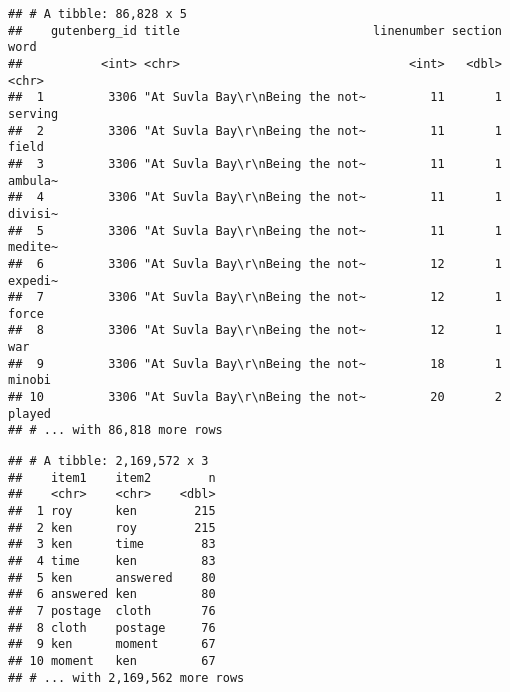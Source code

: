 \documentclass[]{article}
\newenvironment{Shaded}{\begin{snugshade}}{\end{snugshade}}
\newcommand{\DataTypeTok}[1]{\textcolor[rgb]{0.13,0.29,0.53}{#1}}
\newcommand{\DecValTok}[1]{\textcolor[rgb]{0.00,0.00,0.81}{#1}}
\newcommand{\KeywordTok}[1]{\textcolor[rgb]{0.13,0.29,0.53}{\textbf{#1}}}
\newcommand{\NormalTok}[1]{#1}
\newcommand{\OperatorTok}[1]{\textcolor[rgb]{0.81,0.36,0.00}{\textbf{#1}}}
\newcommand{\OtherTok}[1]{\textcolor[rgb]{0.56,0.35,0.01}{#1}}
\newcommand{\StringTok}[1]{\textcolor[rgb]{0.31,0.60,0.02}{#1}}
\begin{document}
\begin{verbatim}
## # A tibble: 86,828 x 5
##    gutenberg_id title                           linenumber section word   
##           <int> <chr>                                <int>   <dbl> <chr>  
##  1         3306 "At Suvla Bay\r\nBeing the not~         11       1 serving
##  2         3306 "At Suvla Bay\r\nBeing the not~         11       1 field  
##  3         3306 "At Suvla Bay\r\nBeing the not~         11       1 ambula~
##  4         3306 "At Suvla Bay\r\nBeing the not~         11       1 divisi~
##  5         3306 "At Suvla Bay\r\nBeing the not~         11       1 medite~
##  6         3306 "At Suvla Bay\r\nBeing the not~         12       1 expedi~
##  7         3306 "At Suvla Bay\r\nBeing the not~         12       1 force  
##  8         3306 "At Suvla Bay\r\nBeing the not~         12       1 war    
##  9         3306 "At Suvla Bay\r\nBeing the not~         18       1 minobi 
## 10         3306 "At Suvla Bay\r\nBeing the not~         20       2 played 
## # ... with 86,818 more rows
\end{verbatim}

\begin{Shaded}
\end{Shaded}

\begin{verbatim}
## # A tibble: 2,169,572 x 3
##    item1    item2        n
##    <chr>    <chr>    <dbl>
##  1 roy      ken        215
##  2 ken      roy        215
##  3 ken      time        83
##  4 time     ken         83
##  5 ken      answered    80
##  6 answered ken         80
##  7 postage  cloth       76
##  8 cloth    postage     76
##  9 ken      moment      67
## 10 moment   ken         67
## # ... with 2,169,562 more rows
\end{verbatim}

\begin{Shaded}
\end{Shaded}
\end{document}
